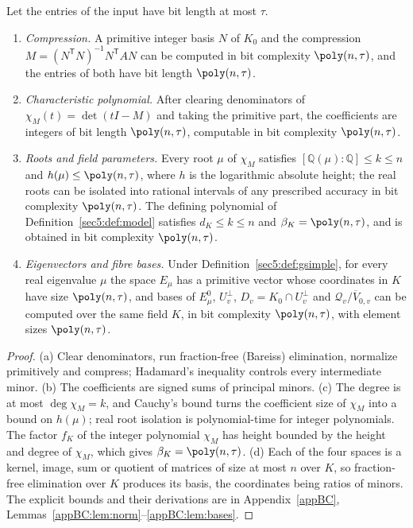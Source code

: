 \begin{lem}\label{sec5:lem:height}\label{sec5:lem:charpoly}\label{sec5:lem:roots}\label{sec5:lem:eigvec}
Let the entries of the input have bit length at most $\tau$.
\begin{enumerate}[label=(\alph*),leftmargin=*]
\item \emph{Compression.} A primitive integer basis $N$ of $K_0$ and the compression
$M=(N^{\mathsf T}N)^{-1}N^{\mathsf T}AN$ can be computed in bit complexity $\poly(n,\tau)$, and the
entries of both have bit length $\poly(n,\tau)$.
\item \emph{Characteristic polynomial.} After clearing denominators of $\chi_M(t)=\det(tI-M)$ and
taking the primitive part, the coefficients are integers of bit length $\poly(n,\tau)$, computable in
bit complexity $\poly(n,\tau)$.
\item \emph{Roots and field parameters.} Every root $\mu$ of $\chi_M$ satisfies
$[\mathbb{Q}(\mu):\mathbb{Q}]\le k\le n$ and $h(\mu)\le\poly(n,\tau)$, where $h$ is the logarithmic
absolute height; the real roots can be isolated into rational intervals of any prescribed accuracy in
bit complexity $\poly(n,\tau)$. The defining polynomial of Definition~\ref{sec5:def:model} satisfies
$d_K\le k\le n$ and $\beta_K=\poly(n,\tau)$, and is obtained in bit complexity $\poly(n,\tau)$.
\item \emph{Eigenvectors and fibre bases.} Under Definition~\ref{sec5:def:gsimple}, for every real
eigenvalue $\mu$ the space $E_\mu$ has a primitive vector whose coordinates in $K$ have size
$\poly(n,\tau)$, and bases of $E_\mu^0$, $U_v^\perp$, $D_v=K_0\cap U_v^\perp$ and
$\mathcal{Q}_v/\overline{V}_{0,v}$ can be computed over the same field $K$, in bit complexity
$\poly(n,\tau)$, with element sizes $\poly(n,\tau)$.
\end{enumerate}
\end{lem}

\begin{proof}
(a) Clear denominators, run fraction-free (Bareiss) elimination, normalize primitively and compress;
Hadamard's inequality controls every intermediate minor. (b) The coefficients are signed sums of
principal minors. (c) The degree is at most $\deg\chi_M=k$, and Cauchy's bound turns the coefficient
size of $\chi_M$ into a bound on $h(\mu)$; real root isolation is polynomial-time for integer
polynomials. The factor $f_K$ of the integer polynomial $\chi_M$ has height bounded by the height and
degree of $\chi_M$, which gives $\beta_K=\poly(n,\tau)$. (d) Each of the four spaces is a kernel, image,
sum or quotient of matrices of size at most $n$ over $K$, so fraction-free elimination over $K$
produces its basis, the coordinates being ratios of minors. The explicit bounds and their derivations
are in Appendix~\ref{appBC}, Lemmas~\ref{appBC:lem:norm}--\ref{appBC:lem:bases}.
\end{proof}

